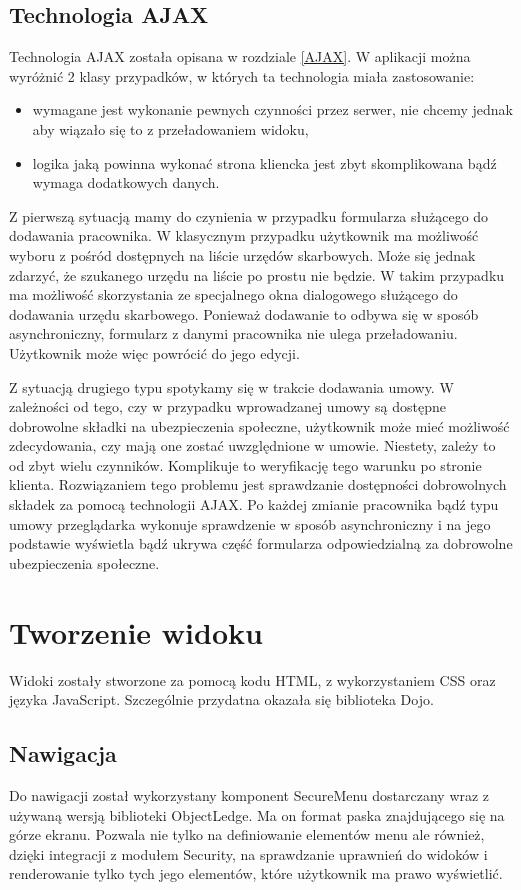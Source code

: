 \subsection[Technologia AJAX][Technologia AJAX]{Technologia AJAX}
Technologia AJAX została opisana w rozdziale \ref{AJAX}. W aplikacji można wyróżnić 2 klasy przypadków, w których ta technologia miała zastosowanie:
\begin{itemize}
	\item wymagane jest wykonanie pewnych czynności przez serwer, nie chcemy jednak aby wiązało się to z przeładowaniem widoku,
	\item logika jaką powinna wykonać strona kliencka jest zbyt skomplikowana bądź wymaga dodatkowych danych.
\end{itemize}
Z pierwszą sytuacją mamy do czynienia w przypadku formularza służącego do dodawania pracownika. W klasycznym przypadku użytkownik ma możliwość wyboru z pośród dostępnych na liście urzędów skarbowych. Może się jednak zdarzyć, że szukanego urzędu na liście po prostu nie będzie. W takim przypadku ma możliwość skorzystania ze specjalnego okna dialogowego służącego do dodawania urzędu skarbowego. Ponieważ dodawanie to odbywa się w sposób asynchroniczny, formularz z danymi pracownika nie ulega przeładowaniu. Użytkownik może więc powrócić do jego edycji.

Z sytuacją drugiego typu spotykamy się w trakcie dodawania umowy. W zależności od tego, czy w przypadku wprowadzanej umowy są dostępne dobrowolne składki na ubezpieczenia społeczne, użytkownik może mieć możliwość zdecydowania, czy mają one zostać uwzględnione w umowie. Niestety, zależy to od zbyt wielu czynników. Komplikuje to weryfikację tego warunku po stronie klienta. Rozwiązaniem tego problemu jest sprawdzanie dostępności dobrowolnych składek za pomocą technologii AJAX. Po każdej zmianie pracownika bądź typu umowy przeglądarka wykonuje sprawdzenie w sposób asynchroniczny i na jego podstawie wyświetla bądź ukrywa część formularza odpowiedzialną za dobrowolne ubezpieczenia społeczne.

\section[Tworzenie widoku][Tworzenie widoku]{Tworzenie widoku}
Widoki zostały stworzone za pomocą kodu HTML, z wykorzystaniem CSS oraz języka JavaScript. Szczególnie przydatna okazała się biblioteka Dojo.

\subsection[Nawigacja][Nawigacja]{Nawigacja}
Do nawigacji został wykorzystany komponent SecureMenu dostarczany wraz z używaną wersją biblioteki ObjectLedge. Ma on format paska znajdującego się na górze ekranu. Pozwala nie tylko na definiowanie elementów menu ale również, dzięki integracji z modułem Security, na sprawdzanie uprawnień do widoków i renderowanie tylko tych jego elementów, które użytkownik ma prawo wyświetlić.

